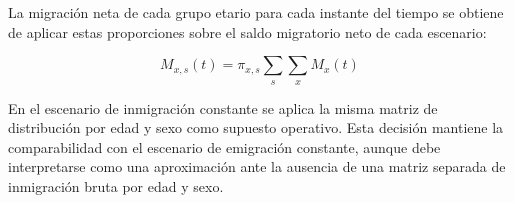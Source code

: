 \documentclass[12pt,a4paper]{article}
\begin{document}

La migración neta de cada grupo etario para cada instante del tiempo se obtiene de aplicar estas proporciones sobre el saldo migratorio neto de cada escenario:

\begin{equation}
\label{eq:descmig}
M_{x,s}(t) = \pi_{x,s} \sum_s \sum_x M_{x}(t)
\end{equation}

En el escenario de inmigración constante se aplica la misma matriz de distribución por edad y sexo como supuesto operativo. Esta decisión mantiene la comparabilidad con el escenario de emigración constante, aunque debe interpretarse como una aproximación ante la ausencia de una matriz separada de inmigración bruta por edad y sexo.
\end{document}
